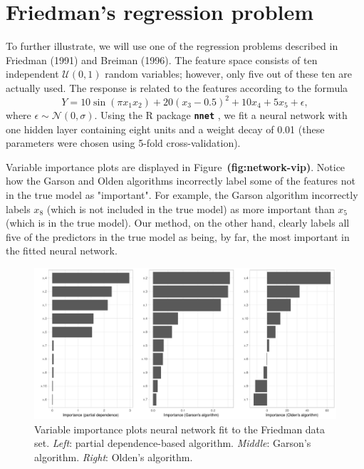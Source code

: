 \documentclass[12pt]{article}
\newcommand{\pkg}[1]{\texorpdfstring%
{{\normalfont\fontseries{b}\selectfont #1}}%
{#1}}
\def\pkg#1{\textbf{\texttt{#1}}}
\def\ref#1{\textbf{(#1)}}
\begin{document}
\section{Friedman's regression problem}

To further illustrate, we will use one of the regression problems described in Friedman (1991) and Breiman (1996). The feature space consists of ten independent $\mathcal{U}\left(0, 1\right)$ random variables; however, only five out of these ten are actually used. The response is related to the features according to the formula
\begin{equation*}
Y = 10 \sin\left(\pi x_1 x_2\right) + 20 \left(x_3 - 0.5\right) ^ 2 + 10 x_4 + 5 x_5 + \epsilon,
\end{equation*}
where $\epsilon \sim \mathcal{N}\left(0, \sigma\right)$. Using the R package \pkg{nnet} \citep{venables-modern-2002}, we fit a neural network with one hidden layer containing eight units and a weight decay of 0.01 (these parameters were chosen using 5-fold cross-validation).

Variable importance plots are displayed in Figure~\ref{fig:network-vip}. Notice how the Garson and Olden algorithms incorrectly label some of the features not in the true model as "important". For example, the Garson algorithm incorrectly labels $x_8$ (which is not included in the true model) as more important than $x_5$ (which is in the true model). Our method, on the other hand, clearly labels all five of the predictors in the true model as being, by far, the most important in the fitted neural network.

\begin{figure}[!htb]
  \centering
  \includegraphics[width=1.0\textwidth]{network-vip}
  \caption{Variable importance plots neural network fit to the Friedman data set. \textit{Left}: partial dependence-based algorithm. \textit{Middle}: Garson's algorithm. \textit{Right}: Olden's algorithm. \label{fig:network-vip}}
\end{figure}
\end{document}
